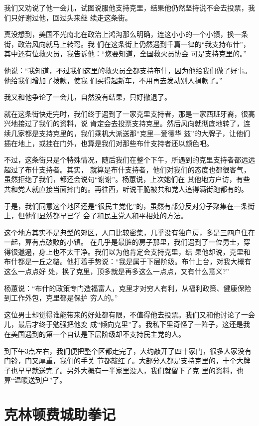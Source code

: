 ﻿\documentclass[11pt]{article}
\begin{document}
我们又劝说了他一会儿，试图说服他支持克里，结果他仍然坚持说不会去投票，我们只好谢过他，回过头来继
续走这条街。

真没想到，美国不光南北在政治上鸿沟那么明确，连这小小的一个小镇，换一条街，政治风向就马上转弯。我
们在这条街上仍然遇到千篇一律的``我支持布什''，其中还有位救火员，我告诉他：``您要知道，全国救火员协会
可是支持克里的。''

他说：``我知道，不过我们这里的救火员全都支持布什，因为他给我们做了好事。他给我们增加了拨款，使我
们买得起新车，不用再去发动别人捐款了。''

我又和他争论了一会儿，自然没有结果，只好撤退了。

就在这条街快走完时，我们终于遇到了一家克里支持者，那是一家西班牙裔，很高兴地接过了我们的资料，说
肯定会去投票支持克里。然后风向就彻底地转了，连续几家都是支持克里的，我们乘机大派送那``克里---爱德华
兹''的大牌子，让他们插在地上，或挂在门外，也算是我们对那些布什支持者还以颜色吧。

不过，这条街只是个特殊情况，随后我们在整个下午，所遇到的克里支持者都远远超过了布什支持者。其实，
就算是布什支持者，他们对我们的态度也都很客气，虽然拒绝了我们，都还会说句``谢谢''。杨蕙说，上次她们在
其他地方户访，有些共和党人就直接当面摔门的。再往西，听说干脆被共和党人追得满街跑都有的。

于是，我们同意这个地区还是``很民主党化''的，虽然有部分反对分子聚集在一条街上，但他们显然都早已学
会了和民主党人和平相处的方法。


这个地方其实不是典型的郊区，人口比较密集，几乎没有独户房，多是三四户住在一起，算有点破败的小镇。
在几乎是最脏的房子那里，我们遇到了一位男士，穿得很邋遢，身上也不太干净。我们以为他肯定会支持克里，结
果他却说，克里和布什都是一丘之貉。他打着手势说：``我是属于下层阶级。布什上台，对我大概有这么一点点好
处，换了克里，顶多就是再多这么一点点，又有什么意义?''

杨蕙说：``布什的政策专门造福富人，克里才对穷人有利，从福利政策、健康保险到工作外包，克里都是保护
穷人的。''

这位男士却觉得谁能带来的好处都有限，不值得他去投票。我们又和他讨论了一会儿，最后才终于勉强把他变
成``倾向克里''了。我私下里奇怪了一阵子，这还是我在美国遇到的第一个自认是下层阶级却不支持民主党的人。

到下午3点左右，我们便把整个区都走完了，大约敲开了四十家门，很多人家没有门铃，门又厚重，我们的手关
节都敲红了。大部分人都是支持克里的，十个大牌子也早早就送完了。另外大概有一半家里没人，我们就留下了克
里的资料，也算``温暖送到户''了。

\section{克林顿费城助拳记}
\end{document}
